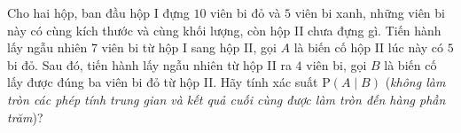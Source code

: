 \begin{ex}%
	Cho hai hộp, ban đầu hộp I đựng $10$ viên bi đỏ và $5$ viên bi xanh, những viên bi này có cùng kích thước và cùng khối lượng, còn hộp II chưa đựng gì. Tiến hành lấy ngẫu nhiên $7$ viên bi từ hộp I sang hộp II, gọi $A$ là biến cố hộp II lúc này có $5$ bi đỏ. Sau đó, tiến hành lấy ngẫu nhiên từ hộp II ra $4$ viên bi, gọi $B$ là biến cố lấy được đúng ba viên bi đỏ từ hộp II. Hãy tính xác suất $\mathrm{P}(A\mid B)$ (\textit{không làm tròn các phép tính trung gian và kết quả cuối cùng được làm tròn đến hàng phần trăm})?
	\par
\end{ex}
